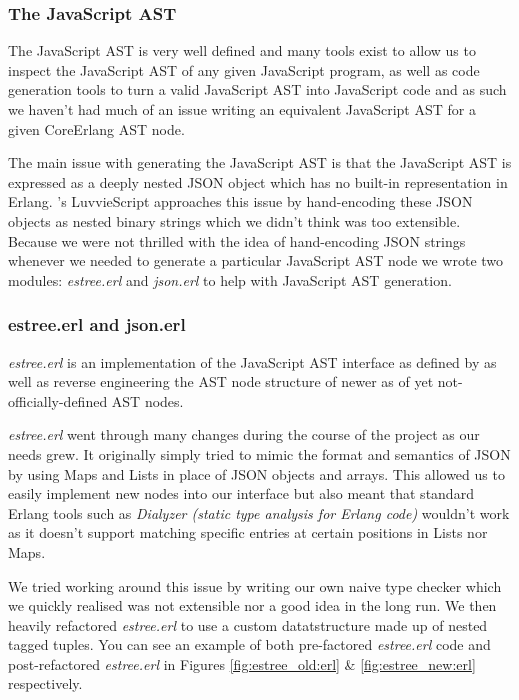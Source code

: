 \documentclass[twoside,12pt,titlepage,a4paper]{article}
\begin{document}
\subsubsection{The JavaScript AST}
The JavaScript AST is very well defined and many tools exist to allow us to inspect the JavaScript AST of any given JavaScript program, as well as code generation tools to turn a valid JavaScript AST into JavaScript code and as such we haven't had much of an issue writing an equivalent JavaScript AST for a given CoreErlang AST node.

The main issue with generating the JavaScript AST is that the JavaScript AST is expressed as a deeply nested JSON object which has no built-in representation in Erlang. \cite{luvvieGitHub}'s LuvvieScript approaches this issue by hand-encoding these JSON objects as nested binary strings which we didn't think was too extensible. Because we were not thrilled with the idea of hand-encoding JSON strings whenever we needed to generate a particular JavaScript AST node we wrote two modules: \textit{estree.erl} and \textit{json.erl} to help with JavaScript AST generation.

\subsubsection{estree.erl and json.erl}
\textit{estree.erl} is an implementation of the JavaScript AST interface as defined by \cite{EStreeMDN} as well as reverse engineering the AST node structure of newer as of yet not-officially-defined AST nodes.

\textit{estree.erl} went through many changes during the course of the project as our needs grew. It originally simply tried to mimic the format and semantics of JSON by using Maps and Lists in place of JSON objects and arrays. This allowed us to easily implement new nodes into our interface but also meant that standard Erlang tools such as \textit{Dialyzer (static type analysis for Erlang code)} wouldn't work as it doesn't support matching specific entries at certain positions in Lists nor Maps. 

We tried working around this issue by writing our own naive type checker which we quickly realised was not extensible nor a good idea in the long run. We then heavily refactored \textit{estree.erl} to use a custom datatstructure made up of nested tagged tuples. You can see an example of both pre-factored \textit{estree.erl} code and post-refactored \textit{estree.erl} in Figures \ref{fig:estree_old:erl} \& \ref{fig:estree_new:erl} respectively.
\end{document}
